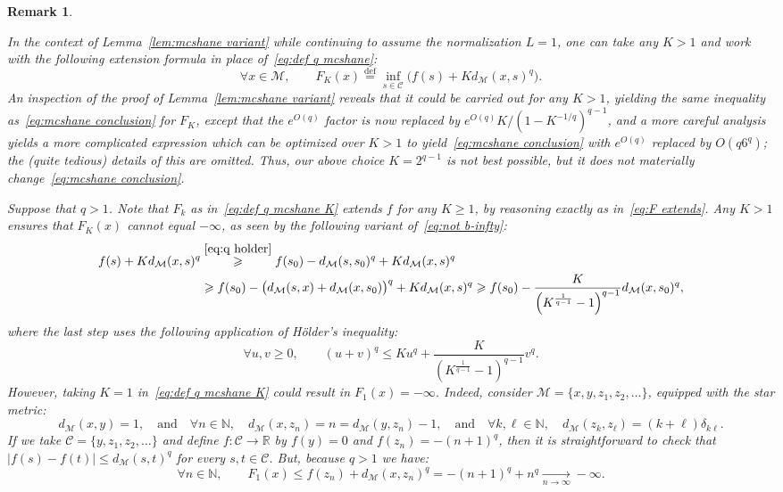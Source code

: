 \documentclass[11pt,reqno]{amsart}
\newtheorem{remark}[theorem]{Remark}
\newcommand{\R}{\mathbb{R}}
\newcommand{\N}{\mathbb{N}}
\renewcommand{\le}{\leqslant}
\renewcommand{\ge}{\geqslant}
\newcommand{\eqdef}{\stackrel{\mathrm{def}}{=}}
\newcommand{\MM}{\mathcal{M}}
\newcommand{\sub}{\mathscr{C}}
\renewcommand{\d}{\delta}
\begin{document}
\begin{remark}\label{rem:star} {\em In the context of Lemma~\ref{lem:mcshane variant} while continuing to assume the normalization $L=1$, one can take any $K>1$ and work with the following extension formula in place of~\eqref{eq:def q mcshane}:
\begin{equation}\label{eq:def q mcshane K}
\forall x\in \MM,\qquad F_K(x)\eqdef \inf_{s\in \sub} \big(f(s)+Kd_\MM(x,s)^q\big). 
\end{equation}
An inspection of the proof of Lemma~\ref{lem:mcshane variant} reveals that it could be carried out for any $K>1$, yielding the same inequality as~\eqref{eq:mcshane conclusion} for $F_K$, except that the $e^{O(q)}$ factor is now replaced by  $e^{O(q)} K/(1-K^{-1/q})^{q-1}$, and a more careful analysis yields a more complicated expression which can be optimized over $K>1$ to yield~\eqref{eq:mcshane conclusion} with $e^{O(q)}$ replaced by  $O(q6^q)$; the (quite tedious) details of this are omitted. Thus, our above choice $K=2^{q-1}$ is not best possible,  but it does not materially change~\eqref{eq:mcshane conclusion}. 

Suppose that $q>1$. Note that $F_k$ as in~\eqref{eq:def q mcshane K} extends $f$ for any $K\ge 1$, by reasoning exactly as in~\eqref{eq:F extends}. Any $K>1$ ensures that $F_K(x)$ cannot equal $-\infty$, as seen by the following variant of~\eqref{eq:not b-infty}: 
\begin{align*}
f(s)+Kd_\MM(x,s)^q&\stackrel{\eqref{eq:q holder}}{\ge} f(s_0)-d_\MM(s,s_0)^q+Kd_\MM(x,s)^q\\&\ge f(s_0)-\big(d_\MM(s,x)+d_\MM(x,s_0)\big)^q+Kd_\MM(x,s)^q\ge f(s_0)-\frac{K}{\left(K^{\frac{1}{q-1}}-1\right)^{q-1}}d_\MM(x,s_0)^q,
\end{align*}
where the last step uses the following  application of H\"older's inequality:
$$
\forall u,v\ge 0,\qquad (u+v)^q \le Ku^q+\frac{K}{\left(K^{\frac{1}{q-1}}-1\right)^{q-1}}v^q.
$$
However, taking $K=1$ in~\eqref{eq:def q mcshane K}  could result in $F_1(x)=-\infty$. Indeed, consider $\MM=\{x,y,z_1,z_2,\ldots\}$, 
equipped with the star metric: 
$$
d_\MM(x,y)=1,\quad \mathrm{and}\quad \forall n\in \N,\quad d_\MM(x,z_n)=n=d_\MM(y,z_n)-1,\quad \mathrm{and}\quad \forall k,\ell\in \N,\quad d_\MM(z_k,z_\ell)=(k+\ell)\d_{k\ell}.  
$$
If we take $\sub=\{y,z_1,z_2,\ldots\}$ and define $f:\sub \to \R$ by $f(y)=0$ and $f(z_n)=-(n+1)^q$, then it is straightforward to check that $|f(s)-f(t)|\le d_\MM(s,t)^q$   for every $s,t\in \sub$. But, because $q>1$ we have:
$$
\forall n\in \N,\qquad F_1(x)\le f(z_n)+d_\MM(x,z_n)^q=-(n+1)^q+n^q\xrightarrow[n \to \infty]{}-\infty.
$$   }
\end{remark}
\end{document}
